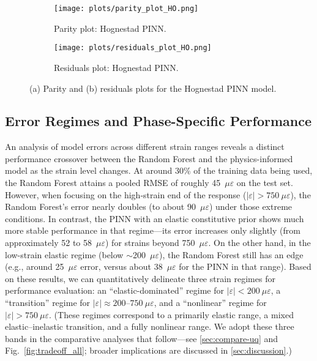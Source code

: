 \documentclass{article}
\begin{document}
\begin{figure}[H]
    \centering
    \begin{subfigure}[b]{0.48\textwidth}
        \texttt{[image: plots/parity\_plot\_HO.png]}
        \caption{Parity plot: Hognestad PINN.}
        \label{fig:parity_HO}
    \end{subfigure}
    \hfill
    \begin{subfigure}[b]{0.48\textwidth}
        \texttt{[image: plots/residuals\_plot\_HO.png]}
        \caption{Residuals plot: Hognestad PINN.}
        \label{fig:residuals_HO}
    \end{subfigure}
    \caption{(a) Parity and (b) residuals plots for the Hognestad PINN model.}
    \label{fig:ho_parity_residual}
\end{figure}

\subsection{Error Regimes and Phase-Specific Performance}
\label{subsec:error_regimes}


An analysis of model errors across different strain ranges reveals a distinct performance crossover between the Random Forest and the physics-informed model as the strain level changes. At around 30\% of the training data being used, the Random Forest attains a pooled RMSE of roughly 45~$\mu\varepsilon$ on the test set. However, when focusing on the high-strain end of the response ($|\varepsilon| > 750~\mu\varepsilon$), the Random Forest’s error nearly doubles (to about 90~$\mu\varepsilon$) under those extreme conditions. In contrast, the PINN with an elastic constitutive prior shows much more stable performance in that regime—its error increases only slightly (from approximately 52 to 58~$\mu\varepsilon$) for strains beyond 750~$\mu\varepsilon$. On the other hand, in the low-strain elastic regime (below $\sim$200~$\mu\varepsilon$), the Random Forest still has an edge (e.g., around 25~$\mu\varepsilon$ error, versus about 38~$\mu\varepsilon$ for the PINN in that range). Based on these results, we can quantitatively delineate three strain regimes for performance evaluation: an “elastic-dominated” regime for $|\varepsilon|<200~\mu\varepsilon$, a “transition” regime for $|\varepsilon| \approx 200$–$750~\mu\varepsilon$, and a “nonlinear” regime for $|\varepsilon|>750~\mu\varepsilon$. (These regimes correspond to a primarily elastic range, a mixed elastic–inelastic transition, and a fully nonlinear range. We adopt these three bands in the comparative analyses that follow—see \cref{sec:compare-uq} and Fig.~\ref{fig:tradeoff_all}; broader implications are discussed in \cref{sec:discussion}.)
\end{document}
